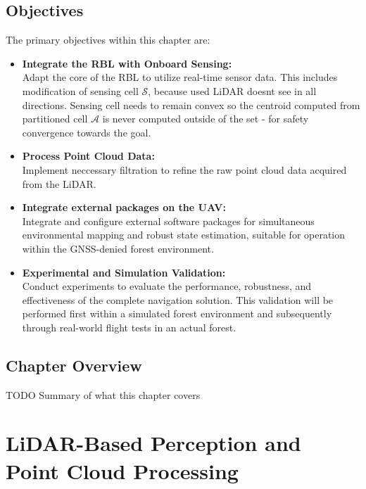         \subsection{Objectives}
            The primary objectives within this chapter are: 
            \begin{itemize}
                \item \textbf{Integrate the \ac{RBL} with Onboard Sensing: } \\
                    Adapt the core of the \ac{RBL} to utilize real-time sensor data. 
                    This includes modification of sensing cell $\mathcal{S}$, because used \ac{LiDAR} doesnt see in all directions. 
                    Sensing cell needs to remain convex so the centroid computed from partitioned cell $\mathcal{A}$ is never computed outside of the set - for safety convergence towards the goal.
                \item \textbf{Process Point Cloud Data: } \\
                    Implement neccessary filtration to refine the raw point cloud data acquired from the \ac{LiDAR}.
                \item \textbf{Integrate external packages on the \ac{UAV}: } \\
                    Integrate and configure external software packages for simultaneous environmental mapping and robust state estimation, suitable for operation within the \ac{GNSS}-denied forest environment.
                \item \textbf{Experimental and Simulation Validation: } \\
                    Conduct experiments to evaluate the performance, robustness, and effectiveness of the complete navigation solution. 
                    This validation will be performed first within a simulated forest environment and subsequently through real-world flight tests in an actual forest.
            \end{itemize}

        \subsection{Chapter Overview}
            TODO Summary of what this chapter covers

    \section{LiDAR-Based Perception and Point Cloud Processing}
